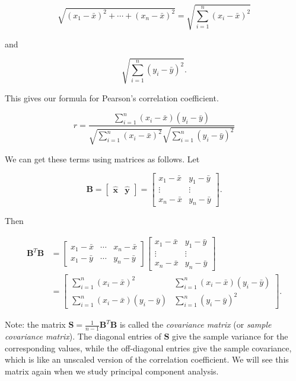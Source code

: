 \documentclass[
]{book}
\theoremstyle{definition}
\theoremstyle{definition}
\theoremstyle{definition}
\theoremstyle{definition}
\theoremstyle{remark}
\begin{document}
\[\sqrt{(x_1-\bar{x})^2+\cdots+(x_n-\bar{x})^2}=\sqrt{\sum_{i=1}^n(x_i-\bar{x})^2}\]

and

\[\sqrt{\sum_{i=1}^n(y_i-\bar{y})^2}.\]

This gives our formula for Pearson's correlation coefficient.

\begin{equation}
r=\frac{\sum_{i=1}^n (x_i-\bar{x})(y_i-\bar{y})}{\sqrt{\sum_{i=1}^n(x_i-\bar{x})^2}\sqrt{\sum_{i=1}^n(y_i-\bar{y})^2}}
\label{eq:pearson}
\end{equation}

We can get these terms using matrices as follows. Let

\[
\mathbf{B}=\begin{bmatrix}\hat{\mathbf{x}} & \hat{\mathbf{y}}\end{bmatrix}=\begin{bmatrix} x_1-\bar{x} & y_1-\bar{y}\\ \vdots & \vdots \\ x_n-\bar{x} & y_n-\bar{y}\end{bmatrix}.\]

Then

\begin{align*}
\mathbf{B}^T \mathbf{B}&=\begin{bmatrix} x_1-\bar{x} & \cdots & x_n-\bar{x}\\  x_1-\bar{y} & \cdots & y_n-\bar{y}\end{bmatrix} \begin{bmatrix} x_1-\bar{x} & y_1-\bar{y}\\ \vdots & \vdots \\ x_n-\bar{x} & y_n-\bar{y}\end{bmatrix}\\
&=\begin{bmatrix} \sum_{i=1}^n(x_i-\bar{x})^2 & \sum_{i=1}^n (x_i-\bar{x})(y_i-\bar{y})\\ \sum_{i=1}^n (x_i-\bar{x})(y_i-\bar{y}) & \sum_{i=1}^n(y_i-\bar{y})^2\end{bmatrix}.
\end{align*}

Note: the matrix \(\mathbf{S}=\frac{1}{n-1}\mathbf{B}^T \mathbf{B}\) is called the \emph{covariance matrix} (or \emph{sample covariance matrix}). The diagonal entries of \(\mathbf{S}\) give the sample variance for the corresponding values, while the off-diagonal entries give the sample covariance, which is like an unscaled version of the correlation coefficient. We will see this matrix again when we study principal component analysis.
\end{document}
